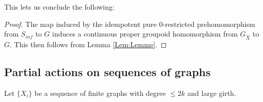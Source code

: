 \begin{conjecture}
This lets us conclude the following:
\begin{proof}
The map induced by the idempotent pure 0-restricted prehomomorphism from $S_{inf}$ to $G$ induces a continuous proper groupoid homomorphism from $G_{\widehat{X}}$ to $G$. This then follows from Lemma \ref{Lem:Lemme}.\end{proof}

\subsection{Partial actions on sequences of graphs}
Let $\lbrace X_{i} \rbrace$ be a sequence of finite graphs with degree $\leq 2k$ and large girth.


\end{conjecture}
